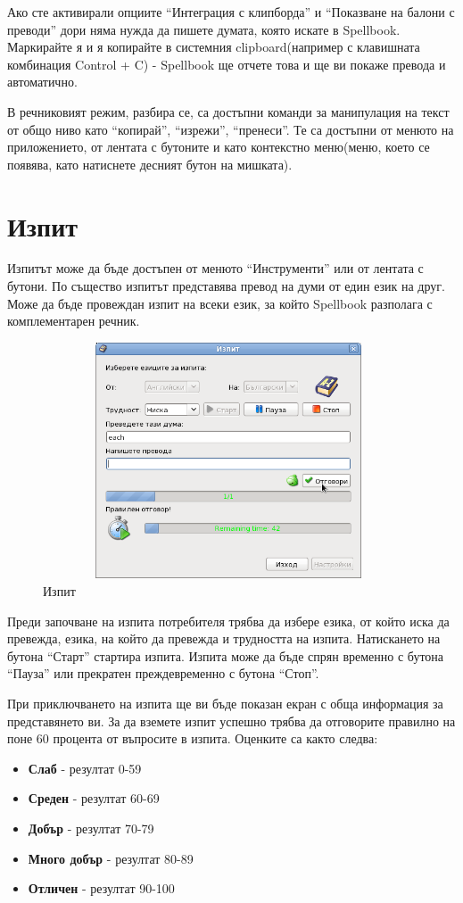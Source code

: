 Ако сте активирали опциите "`Интеграция с клипборда"' и "`Показване на
балони с преводи"' дори няма нужда да пишете думата, която искате в
Spellbook. Маркирайте я и я копирайте в системния clipboard(например с
клавишната комбинация Control + C) - Spellbook ще отчете това и ще ви
покаже превода и автоматично.

В речниковият режим, разбира се, са достъпни команди за манипулация на
текст от общо ниво като "`копирай"', "`изрежи"', "`пренеси"'. Те са
достъпни от менюто на приложението, от лентата с бутоните и като
контекстно меню(меню, което се появява, като натиснете десният бутон
на мишката).
\section{Изпит}
Изпитът може да бъде достъпен от менюто "`Инструменти"' или от лентата
с бутони. По същество изпитът представява превод на думи от един език
на друг. Може да бъде провеждан изпит на всеки език, за който
Spellbook разполага с комплементарен речник. 

\begin{figure}[htbp]
  \caption{Изпит}
  \centering
  \includegraphics[width=110mm, height=70mm]{images/exam_dialog.png}
\end{figure}

Преди започване на изпита потребителя трябва да избере езика, от който
иска да превежда, езика, на който да превежда и трудността на
изпита. Натискането на бутона "`Старт"' стартира изпита. Изпита може
да бъде спрян временно с бутона "`Пауза"' или прекратен преждевременно
с бутона "`Стоп"'. 

При приключването на изпита ще ви бъде показан екран с обща информация
за представянето ви. За да вземете изпит успешно трябва да отговорите
правилно на поне 60 процента от въпросите в изпита. Оценките са както
следва:
\begin{itemize}
  \item \textbf{Слаб} - резултат 0-59
  \item \textbf{Среден} - резултат 60-69
  \item \textbf{Добър} - резултат 70-79
  \item \textbf{Много добър} - резултат 80-89
  \item \textbf{Отличен} - резултат 90-100
\end{itemize}

